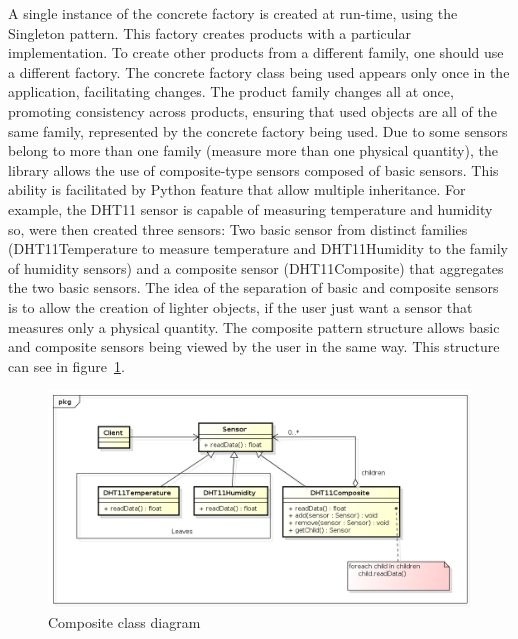 \documentclass{acm_proc_article-sp}
\begin{document}
A single instance of the concrete factory is created at run-time, using the Singleton pattern. This factory creates products with a particular implementation. To create other products from a different family, one should use a different factory. The concrete factory class being used appears only once in the application, facilitating changes. The product family changes all at once, promoting consistency across products, ensuring that used objects are all of the same family, represented by the concrete factory being used.
\newline
\newline
Due to some sensors belong to more than one family (measure more than one physical quantity), the library allows the use of composite-type sensors composed of basic sensors. This ability is facilitated by Python feature that allow multiple inheritance. For example, the DHT11 sensor is capable of measuring temperature and humidity so, were then created three sensors: Two basic sensor from distinct families (DHT11Temperature to measure temperature and DHT11Humidity to the family of humidity sensors) and a composite sensor (DHT11Composite) that aggregates the two basic sensors. The idea of the separation of basic and composite sensors is to allow the creation of lighter objects, if the user just want a sensor that measures only a physical quantity. The composite pattern structure allows basic and composite sensors being viewed by the user in the same way. This structure can see in figure~\ref{fig:composite}.
\newline
\begin{figure}[ht]
\centering
    \includegraphics[width=1.0\textwidth,natwidth=610,natheight=642]{pictures/composite.png}
    \caption{Composite class diagram}
    \label{fig:composite}
\end{figure}
\end{document}
